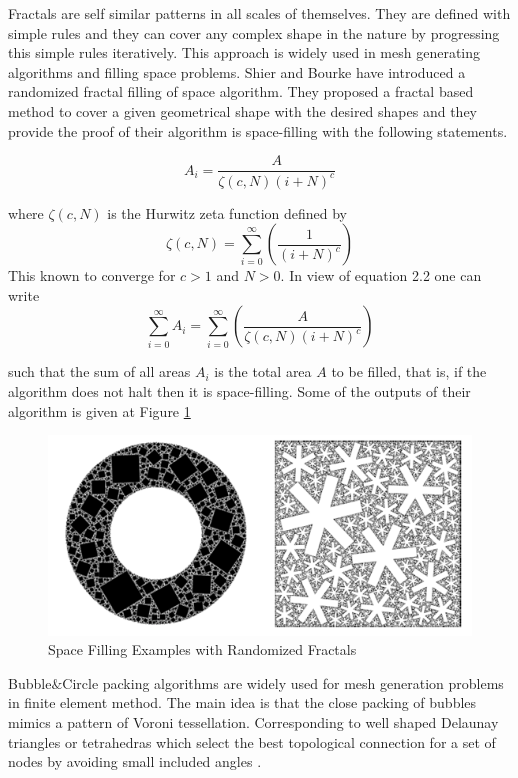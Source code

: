 Fractals are self similar  patterns in all scales of themselves. They are defined with simple rules and they can cover any complex shape in the nature by progressing this simple rules iteratively. This approach is widely used in mesh generating algorithms and filling space problems.  Shier and Bourke \cite{26} have introduced a randomized fractal filling of space algorithm. They proposed a fractal based method to cover a given geometrical shape with the desired shapes and they provide the proof of their algorithm is space-filling with the following statements. 

	\begin{equation} %
	A_i = {\frac{A}{{\zeta(c,N)(i+N)^c}}}
	\end{equation}	
	
	where ${\zeta(c,N)}$ is the Hurwitz zeta function defined by 
	\begin{equation}
	\zeta(c,N) = \sum_{i=0}^{\infty}\left(\frac{1}{(i+N)^c}\right)
	\end{equation}
	This known to converge for $c>1$ and $N>0$. In view of equation 2.2 one can write
	\begin{equation}
	\sum_{i=0}^{\infty}A_i = \sum_{i = 0}^{\infty}\left(\frac{A}{\zeta(c,N)(i+N)^c}\right)
	\end{equation}


such that the sum of all areas $A_i$ is the total area $A$ to be filled, that is, if the algorithm does not halt then it is space-filling. 
Some of the outputs of their algorithm is given at Figure \ref{space_filling}



\begin{figure}[H]
	\caption{Space Filling Examples with Randomized Fractals \cite{26}} \label{space_filling}
	\centering
	\includegraphics[scale = 1]{randomized1}
\end{figure}


Bubble$\&$Circle packing algorithms are widely used for mesh generation problems in finite element method. The main idea is that the close packing of bubbles mimics a pattern of Voroni tessellation. Corresponding to well shaped Delaunay triangles or tetrahedras which select the best topological connection for a set of nodes by avoiding small included angles \cite{27}.


